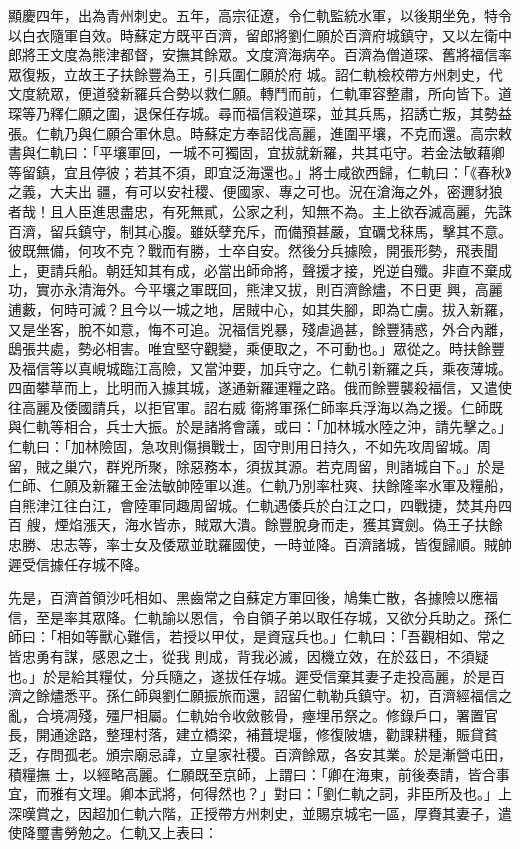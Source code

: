 \begin{pinyinscope}
 顯慶四年，出為青州刺史。五年，高宗征遼，令仁軌監統水軍，以後期坐免，特令以白衣隨軍自效。時蘇定方既平百濟，留郎將劉仁願於百濟府城鎮守，又以左衛中郎將王文度為熊津都督，安撫其餘眾。文度濟海病卒。百濟為僧道琛、舊將福信率眾復叛，立故王子扶餘豐為王，引兵圍仁願於府
 城。詔仁軌檢校帶方州刺史，代文度統眾，便道發新羅兵合勢以救仁願。轉鬥而前，仁軌軍容整肅，所向皆下。道琛等乃釋仁願之圍，退保任存城。尋而福信殺道琛，並其兵馬，招誘亡叛，其勢益張。仁軌乃與仁願合軍休息。時蘇定方奉詔伐高麗，進圍平壤，不克而還。高宗敕書與仁軌曰：「平壤軍回，一城不可獨固，宜拔就新羅，共其屯守。若金法敏藉卿等留鎮，宜且停彼；若其不須，即宜泛海還也。」將士咸欲西歸，仁軌曰：「《春秋》之義，大夫出
 疆，有可以安社稷、便國家、專之可也。況在滄海之外，密邇豺狼者哉！且人臣進思盡忠，有死無貳，公家之利，知無不為。主上欲吞滅高麗，先誅百濟，留兵鎮守，制其心腹。雖妖孽充斥，而備預甚嚴，宜礪戈秣馬，擊其不意。彼既無備，何攻不克？戰而有勝，士卒自安。然後分兵據險，開張形勢，飛表聞上，更請兵船。朝廷知其有成，必當出師命將，聲援才接，兇逆自殲。非直不棄成功，實亦永清海外。今平壤之軍既回，熊津又拔，則百濟餘燼，不日更
 興，高麗逋藪，何時可滅？且今以一城之地，居賊中心，如其失腳，即為亡虜。拔入新羅，又是坐客，脫不如意，悔不可追。況福信兇暴，殘虐過甚，餘豐猜惑，外合內離，鴟張共處，勢必相害。唯宜堅守觀變，乘便取之，不可動也。」眾從之。時扶餘豐及福信等以真峴城臨江高險，又當沖要，加兵守之。仁軌引新羅之兵，乘夜薄城。四面攀草而上，比明而入據其城，遂通新羅運糧之路。俄而餘豐襲殺福信，又遣使往高麗及倭國請兵，以拒官軍。詔右威
 衛將軍孫仁師率兵浮海以為之援。仁師既與仁軌等相合，兵士大振。於是諸將會議，或曰：「加林城水陸之沖，請先擊之。」仁軌曰：「加林險固，急攻則傷損戰士，固守則用日持久，不如先攻周留城。周留，賊之巢穴，群兇所聚，除惡務本，須拔其源。若克周留，則諸城自下。」於是仁師、仁願及新羅王金法敏帥陸軍以進。仁軌乃別率杜爽、扶餘隆率水軍及糧船，自熊津江往白江，會陸軍同趣周留城。仁軌遇倭兵於白江之口，四戰捷，焚其舟四百
 艘，煙焰漲天，海水皆赤，賊眾大潰。餘豐脫身而走，獲其寶劍。偽王子扶餘忠勝、忠志等，率士女及倭眾並耽羅國使，一時並降。百濟諸城，皆復歸順。賊帥遲受信據任存城不降。



 先是，百濟首領沙吒相如、黑齒常之自蘇定方軍回後，鳩集亡散，各據險以應福信，至是率其眾降。仁軌諭以恩信，令自領子弟以取任存城，又欲分兵助之。孫仁師曰：「相如等獸心難信，若授以甲仗，是資寇兵也。」仁軌曰：「吾觀相如、常之皆忠勇有謀，感恩之士，從我
 則成，背我必滅，因機立效，在於茲日，不須疑也。」於是給其糧仗，分兵隨之，遂拔任存城。遲受信棄其妻子走投高麗，於是百濟之餘燼悉平。孫仁師與劉仁願振旅而還，詔留仁軌勒兵鎮守。初，百濟經福信之亂，合境凋殘，殭尸相屬。仁軌始令收斂骸骨，瘞埋吊祭之。修錄戶口，署置官長，開通途路，整理村落，建立橋梁，補葺堤堰，修復陂塘，勸課耕種，賑貸貧乏，存問孤老。頒宗廟忌諱，立皇家社稷。百濟餘眾，各安其業。於是漸營屯田，積糧撫
 士，以經略高麗。仁願既至京師，上謂曰：「卿在海東，前後奏請，皆合事宜，而雅有文理。卿本武將，何得然也？」對曰：「劉仁軌之詞，非臣所及也。」上深嘆賞之，因超加仁軌六階，正授帶方州刺史，並賜京城宅一區，厚賚其妻子，遣使降璽書勞勉之。仁軌又上表曰：




\end{pinyinscope}
